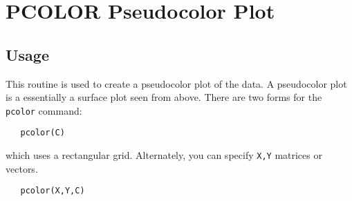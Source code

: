 \section{PCOLOR Pseudocolor Plot}

\subsection{Usage}

This routine is used to create a pseudocolor plot of the data.
A pseudocolor plot is a essentially a surface plot seen from 
above.  There are two forms for the \verb|pcolor| command:
\begin{verbatim}
   pcolor(C)
\end{verbatim}
which uses a rectangular grid.  Alternately, you can specify
\verb|X,Y| matrices or vectors.
\begin{verbatim}
   pcolor(X,Y,C)
\end{verbatim}
